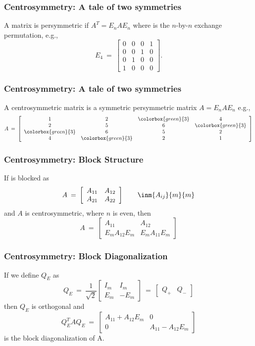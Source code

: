 \documentclass[bigger]{beamer}
\begin{document}
\begin{frame}
\frametitle{Centrosymmetry: A tale of two symmetries}
\label{sec-1-8}

A matrix  is persymmetric if  $A^{T} = E_{n}AE_{n}$ where  is
the $n$-by-$n$ exchange permutation, e.g.,
\[
E_{4} \:=\: 
\left[ 
\begin{array}{cccc} 
0 & 0 & 0 & 1\\
0 & 0 & 1 & 0 \\
0 & 1 & 0 & 0 \\
1 & 0 & 0 & 0
\end{array} 
\right].
\]
\end{frame}
\begin{frame}
\frametitle{Centrosymmetry: A tale of two symmetries}
\label{sec-1-9}

A centrosymmetric matrix is a symmetric persymmetric matrix $A = E_{n}AE_{n}$ e.g.,
\[
A \:=\: 
\left[ 
\begin{array}{cccc} 
1 & 2 & \colorbox{green}{3} & 4\\
2 & 5 & 6 & \colorbox{green}{3} \\
\colorbox{green}{3} & 6 & 5 & 2 \\
4 & \colorbox{green}{3} & 2 & 1
\end{array} 
\right]
\]
\end{frame}
\begin{frame}
\frametitle{Centrosymmetry: Block Structure}
\label{sec-1-10}

If  is blocked as
\[A \:=\: \left[ \begin{array}{cc} A_{11} & A_{12} \\ A_{21} & A_{22} \end{array} \right]
\qquad \inm{A_{ij}}{m}{m}\]
and $A$ is centrosymmetric, where $n$ is even, then \[A \:= \: \left[ \begin{array}{cc} A_{11} & A_{12} \\ E_{m}A_{12}E_{m} & E_{m}A_{11}E_{m}
\end{array} \right]\]
\end{frame}
\begin{frame}
\frametitle{Centrosymmetry: Block Diagonalization}
\label{sec-1-11}

If we define $Q_E$ as
\[Q_{E} \:=\: \frac{1}{\sqrt{2}} 
\left[ \begin{array}{c|c} I_{m} & I_{m} \\ E_{m} & -E_{m} \end{array} \right]
\:=\: \left[ \begin{array}{c|c} Q_{+} & Q_{-} \end{array} \right]\]
then $Q_{E}$ is orthogonal and
\[Q_{E}^{T} A Q_{E} \:=\: 
\left[ \begin{array}{cc} A_{11} + A_{12}E_{m} & 0 \\ 0 & A_{11}-A_{12}E_{m} \end{array} \right]\]
is the block diagonalization of A.
\end{frame}
\end{document}
